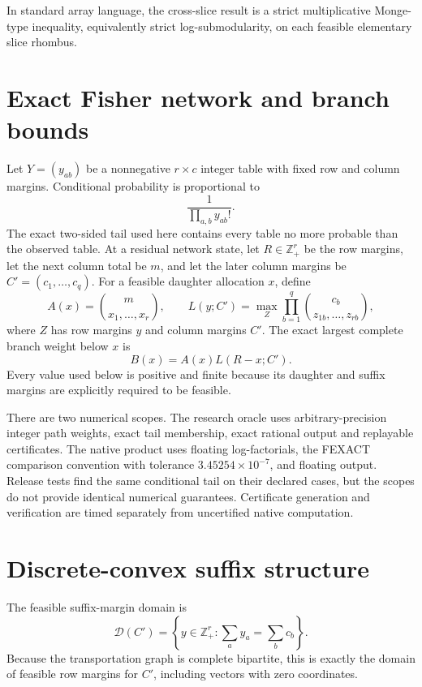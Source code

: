 \documentclass[10pt]{article}
\newcommand{\Z}{\mathbb Z}
\begin{document}
In standard array language, the cross-slice result is a strict multiplicative
Monge-type inequality, equivalently strict log-submodularity, on each
feasible elementary slice rhombus.

\section{Exact Fisher network and branch bounds}

Let \(Y=(y_{ab})\) be a nonnegative \(r\times c\) integer table with
fixed row and column margins.  Conditional probability is proportional
to
\[
  \frac{1}{\prod_{a,b}y_{ab}!}.
\]
The exact two-sided tail used here contains every table no more probable
than the observed table.  At a residual network state, let
\(R\in\Z_+^r\) be the row margins, let the next column total be \(m\),
and let the later column margins be \(C'=(c_1,\ldots,c_q)\).
For a feasible daughter allocation \(x\), define
\[
 A(x)=\binom{m}{x_1,\ldots,x_r},
 \qquad
 L(y;C')=\max_Z\prod_{b=1}^q
 \binom{c_b}{z_{1b},\ldots,z_{rb}},
\]
where \(Z\) has row margins \(y\) and column margins \(C'\).  The exact
largest complete branch weight below \(x\) is
\begin{equation}
  B(x)=A(x)L(R-x;C').
  \label{eq:branch}
\end{equation}
Every value used below is positive and finite because its daughter and
suffix margins are explicitly required to be feasible.

There are two numerical scopes.  The research oracle uses
arbitrary-precision integer path weights, exact tail membership, exact
rational output and replayable certificates.  The native product uses
floating log-factorials, the FEXACT comparison convention with tolerance
\(3.45254\times10^{-7}\), and floating output.  Release tests find the
same conditional tail on their declared cases, but the scopes do not
provide identical numerical guarantees.  Certificate generation and
verification are timed separately from uncertified native computation.

\section{Discrete-convex suffix structure}

The feasible suffix-margin domain is
\[
 \mathcal D(C')=
 \left\{y\in\Z_+^r:\sum_a y_a=\sum_b c_b\right\}.
\]
Because the transportation graph is complete bipartite, this is exactly
the domain of feasible row margins for \(C'\), including vectors with
zero coordinates.
\end{document}
